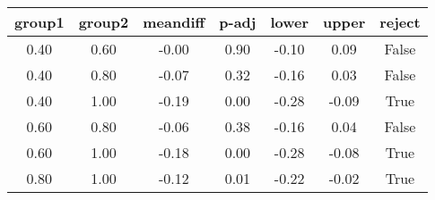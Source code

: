 \begin{tabular}{|c|c|c|c|c|c|c|}
\toprule
 group1 &  group2 &  meandiff &  p-adj &  lower &  upper &  reject \\
\midrule
   0.40 &    0.60 &     -0.00 &   0.90 &  -0.10 &   0.09 &   False \\
   0.40 &    0.80 &     -0.07 &   0.32 &  -0.16 &   0.03 &   False \\
   0.40 &    1.00 &     -0.19 &   0.00 &  -0.28 &  -0.09 &    True \\
   0.60 &    0.80 &     -0.06 &   0.38 &  -0.16 &   0.04 &   False \\
   0.60 &    1.00 &     -0.18 &   0.00 &  -0.28 &  -0.08 &    True \\
   0.80 &    1.00 &     -0.12 &   0.01 &  -0.22 &  -0.02 &    True \\
\bottomrule
\end{tabular}
